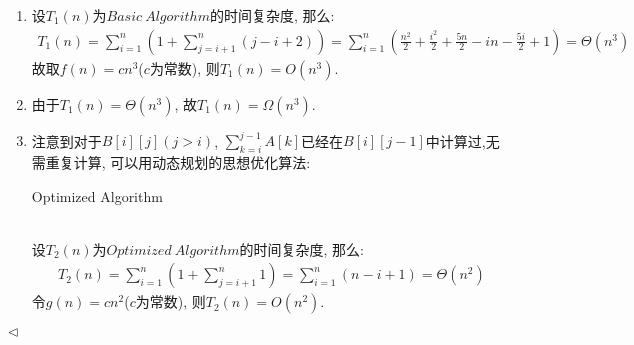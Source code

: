 \documentclass[11pt]{article}
\newenvironment{answer}[1][Answer]{\begin{trivlist}
\item[\hskip \labelsep{\bfseries\itshape#1.}\hskip \labelsep]}{\hfill$\lhd$\end{trivlist}}
\begin{document}
\begin{answer}
    \begin{enumerate} [label = (\arabic*)]
        \item 设$T_1(n)$为$Basic\ Algorithm$的时间复杂度, 那么:
        \begin{align*}
            T_1(n) = \sum_{i=1}^{n} \left(1 + \sum_{j=i+1}^{n} \left(j-i+2 \right)\right) = \sum_{i=1}^{n} \left(\frac{n^2}{2} + \frac{i^2}{2} + \frac{5n}{2} - in - \frac{5i}{2} + 1\right) = \Theta(n^3)
        \end{align*}
        故取$f(n) = c n^3$($c$为常数), 则$T_1(n) = O(n^3)$.
        \item 由于$T_1(n) = \Theta(n^3)$, 故$T_1(n) = \Omega(n^3)$.
        \item 注意到对于$B[i][j](j>i)$, $\sum_{k=i}^{j-1} A[k]$已经在$B[i][j-1]$中计算过,无需重复计算, 可以用动态规划的思想优化算法:
        \begin{algorithm}
            \caption{Optimized Algorithm}
        \end{algorithm}
        \\设$T_2(n)$为$Optimized\ Algorithm$的时间复杂度, 那么:
        \begin{align*}
            T_2(n) = \sum_{i=1}^{n} \left(1 + \sum_{j=i+1}^{n} 1\right) = \sum_{i=1}^{n} (n-i+1) = \Theta(n^2)
        \end{align*}
        令$g(n) = c n^2$($c$为常数), 则$T_2(n) = O(n^2)$.
    \end{enumerate}
\end{answer}
    
\end{document}
